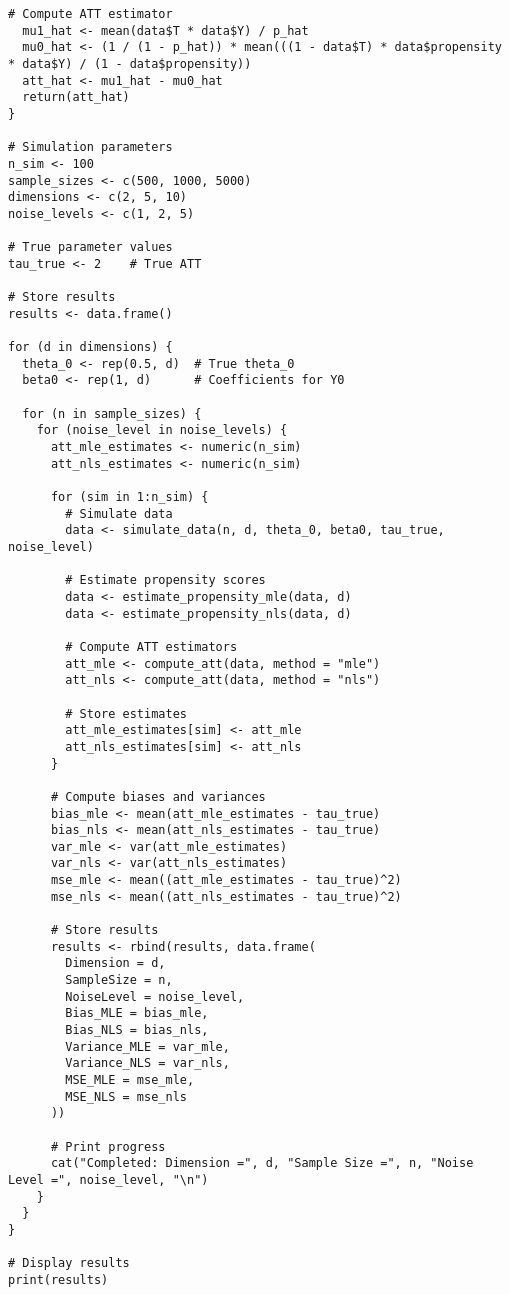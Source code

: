 \documentclass{article}
\begin{document}
\begin{lstlisting}[style=Rstyle, caption=Simple Regression on Price Experiment]
  # Compute ATT estimator
  mu1_hat <- mean(data$T * data$Y) / p_hat
  mu0_hat <- (1 / (1 - p_hat)) * mean(((1 - data$T) * data$propensity * data$Y) / (1 - data$propensity))
  att_hat <- mu1_hat - mu0_hat
  return(att_hat)
}

# Simulation parameters
n_sim <- 100     
sample_sizes <- c(500, 1000, 5000)
dimensions <- c(2, 5, 10)         
noise_levels <- c(1, 2, 5)        

# True parameter values
tau_true <- 2    # True ATT

# Store results
results <- data.frame()

for (d in dimensions) {
  theta_0 <- rep(0.5, d)  # True theta_0
  beta0 <- rep(1, d)      # Coefficients for Y0
  
  for (n in sample_sizes) {
    for (noise_level in noise_levels) {
      att_mle_estimates <- numeric(n_sim)
      att_nls_estimates <- numeric(n_sim)
      
      for (sim in 1:n_sim) {
        # Simulate data
        data <- simulate_data(n, d, theta_0, beta0, tau_true, noise_level)
        
        # Estimate propensity scores
        data <- estimate_propensity_mle(data, d)
        data <- estimate_propensity_nls(data, d)
        
        # Compute ATT estimators
        att_mle <- compute_att(data, method = "mle")
        att_nls <- compute_att(data, method = "nls")
        
        # Store estimates
        att_mle_estimates[sim] <- att_mle
        att_nls_estimates[sim] <- att_nls
      }
      
      # Compute biases and variances
      bias_mle <- mean(att_mle_estimates - tau_true)
      bias_nls <- mean(att_nls_estimates - tau_true)
      var_mle <- var(att_mle_estimates)
      var_nls <- var(att_nls_estimates)
      mse_mle <- mean((att_mle_estimates - tau_true)^2)
      mse_nls <- mean((att_nls_estimates - tau_true)^2)
      
      # Store results
      results <- rbind(results, data.frame(
        Dimension = d,
        SampleSize = n,
        NoiseLevel = noise_level,
        Bias_MLE = bias_mle,
        Bias_NLS = bias_nls,
        Variance_MLE = var_mle,
        Variance_NLS = var_nls,
        MSE_MLE = mse_mle,
        MSE_NLS = mse_nls
      ))
      
      # Print progress
      cat("Completed: Dimension =", d, "Sample Size =", n, "Noise Level =", noise_level, "\n")
    }
  }
}

# Display results
print(results)
\end{lstlisting}
\end{document}
